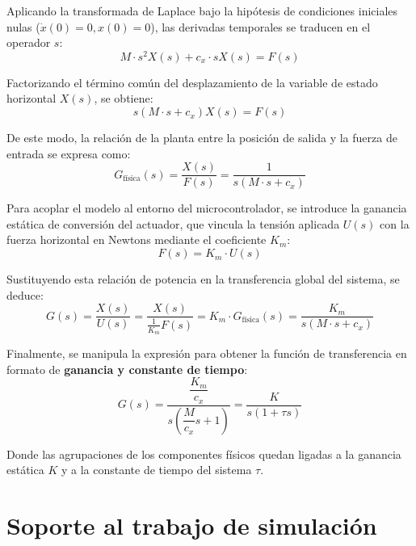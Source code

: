 \documentclass[11pt,fleqn]{book} %
\begin{document}
Aplicando la transformada de Laplace bajo la hipótesis de condiciones iniciales nulas ($\dot{x}(0) = 0, x(0) = 0$), las derivadas temporales se traducen en el operador $s$:
\begin{equation}
	M \cdot s^2 X(s) + c_x \cdot s X(s) = F(s)
\end{equation}

Factorizando el término común del desplazamiento de la variable de estado horizontal $X(s)$, se obtiene:
\begin{equation}
	s(M \cdot s + c_x) X(s) = F(s)
\end{equation}

De este modo, la relación de la planta entre la posición de salida y la fuerza de entrada se expresa como:
\begin{equation}
	G_{\text{física}}(s) = \frac{X(s)}{F(s)} = \frac{1}{s(M \cdot s + c_x)}
\end{equation}

Para acoplar el modelo al entorno del microcontrolador, se introduce la ganancia estática de conversión del actuador, que vincula la tensión aplicada $U(s)$ con la fuerza horizontal en Newtons mediante el coeficiente $K_m$:
\begin{equation}
	F(s) = K_m \cdot U(s)
\end{equation}

Sustituyendo esta relación de potencia en la transferencia global del sistema, se deduce:
\begin{equation}
	G(s) = \frac{X(s)}{U(s)} = \frac{X(s)}{\frac{1}{K_m}F(s)} = K_m \cdot G_{\text{física}}(s) = \frac{K_m}{s(M \cdot s + c_x)}
\end{equation}

Finalmente, se manipula la expresión para obtener la función de transferencia en formato de \textbf{ganancia y constante de tiempo}:
\begin{equation}
	G(s) = \frac{\dfrac{K_m}{c_x}}{s\left(\dfrac{M}{c_x}s + 1\right)} = \frac{K}{s(1 + \tau s)}
\end{equation}

Donde las agrupaciones de los componentes físicos quedan ligadas a la ganancia estática $K$ y a la constante de tiempo del sistema $\tau$.
\newpage

\section{Soporte al trabajo de simulación}
\end{document}
